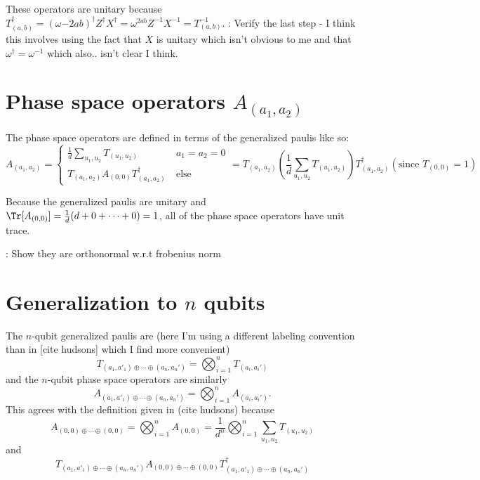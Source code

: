 \documentclass{report}
\begin{document}
 These operators are unitary because $T_{(a,b)}^\dagger=(\omega{-2ab})^\dagger Z^\dagger X^\dagger=\omega^{2ab}Z^{-1}X^{-1}=T^{-1}_{(a,b)}$. \todo: Verify the last step - I think this involves using the fact that $X$ is unitary which isn't obvious to me and that $\omega^\dagger=\omega^{-1}$ which also.. isn't clear I think.
 
\section{Phase space operators $A_{(a_1,a_2)}$}
  
 The phase space operators are defined in terms of the generalized paulis like so:
 \begin{equation}
 A_{(a_1,a_2)}=
 \begin{cases}
 \frac{1}{d}\sum_{u_1,u_2}T_{(u_1,u_2)}\ &a_1=a_2=0\\
 T_{(a_1,a_2)}A_{(0,0)}T_{(a_1,a_2)}^\dagger\ &\text{else}
 \end{cases}
 =
  T_{(a_1,a_2)}\left( \frac{1}{d}\sum_{u_1,u_2}T_{(u_1,u_2)}\right)T_{(a_1,a_2)}^\dagger\left(\text{since }T_{(0,0)}=1\right)
 \end{equation}
 
 Because the generalized paulis are unitary and $\Tr[A_{(0,0)}]=\frac{1}{d}(d+0+\cdots+0)=1$, all of the phase space operators have unit trace. 
 
 \todo: Show they are orthonormal w.r.t frobenius norm
 
 \section{Generalization to $n$ qubits}
 
 The $n$-qubit generalized paulis are (here I'm using a different labeling convention than in [\todo cite hudsons] which I find more convenient)
 \begin{equation}T_{(a_1,a'_1)\oplus\cdots\oplus(a_n,a_n')}=\bigotimes_{i=1}^n T_{(a_i,a_i')}\end{equation}
 and the $n$-qubit phase space operators are similarly 
  \begin{equation}A_{(a_1,a'_1)\oplus\cdots\oplus(a_n,a_n')}=\bigotimes_{i=1}^n A_{(a_i,a_i')}.\end{equation}
  This agrees with the definition given in (\todo cite hudsons) because
  \begin{equation}\label{eq:A00} A_{(0,0)\oplus\cdots\oplus(0,0)}=\bigotimes_{i=1}^n A_{(0,0)}=\frac{1}{d^n}\bigotimes_{i=1}^n\sum_{u_1,u_2}T_{(u_1,u_2)}\end{equation}
  and
  \begin{equation}\label{eq:Aab} T_{(a_1,a'_1)\oplus\cdots\oplus(a_n,a_n')}A_{(0,0)\oplus\cdots\oplus(0,0)}T^\dagger_{(a_1,a'_1)\oplus\cdots\oplus(a_n,a_n')}\end{equation}
\end{document}
